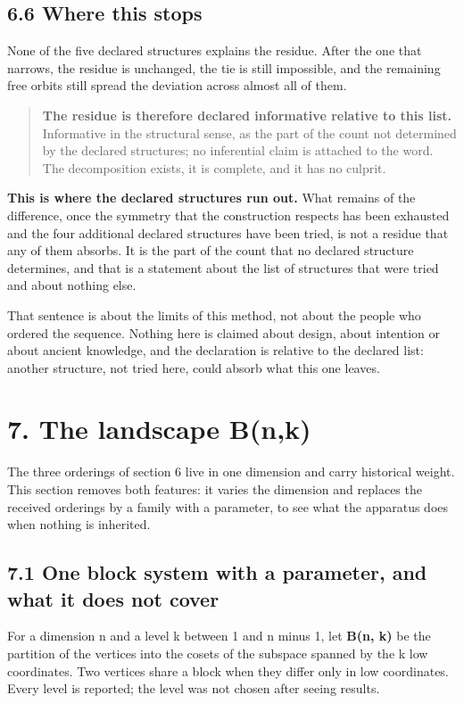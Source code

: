 \documentclass[11pt,a4paper]{article}
\begin{document}
\subsection*{6.6 Where this stops}

None of the five declared structures explains the residue. After the one that narrows, the residue is unchanged, the tie is still impossible, and the remaining free orbits still spread the deviation across almost all of them.

\begin{quote}
\textbf{The residue is therefore declared informative relative to this list.} Informative in the structural sense, as the part of the count not determined by the declared structures; no inferential claim is attached to the word. The decomposition exists, it is complete, and it has no culprit.
\end{quote}

\textbf{This is where the declared structures run out.} What remains of the difference, once the symmetry that the construction respects has been exhausted and the four additional declared structures have been tried, is not a residue that any of them absorbs. It is the part of the count that no declared structure determines, and that is a statement about the list of structures that were tried and about nothing else.

That sentence is about the limits of this method, not about the people who ordered the sequence. Nothing here is claimed about design, about intention or about ancient knowledge, and the declaration is relative to the declared list: another structure, not tried here, could absorb what this one leaves.

\section*{7. The landscape B(n,k)}

The three orderings of section 6 live in one dimension and carry historical weight. This section removes both features: it varies the dimension and replaces the received orderings by a family with a parameter, to see what the apparatus does when nothing is inherited.

\subsection*{7.1 One block system with a parameter, and what it does not cover}

For a dimension n and a level k between 1 and n minus 1, let \textbf{B(n, k)} be the partition of the vertices into the cosets of the subspace spanned by the k low coordinates. Two vertices share a block when they differ only in low coordinates. Every level is reported; the level was not chosen after seeing results.
\end{document}
